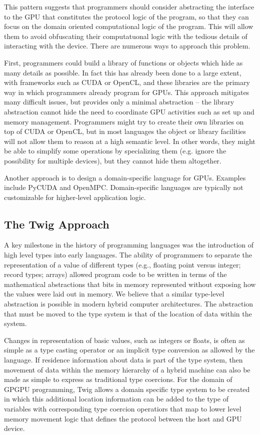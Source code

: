 \documentclass[11pt]{article}
\begin{document}
This pattern suggests that programmers should consider abstracting the
interface to the GPU that constitutes the protocol logic of the
program, so that they can focus on the domain oriented computational
logic of the program.  This will allow them to avoid obfuscating their
computatuonal logic with the tedious details of interacting with the
device. There are numerous ways to approach this problem.

First, programmers could build a library of functions or objects which hide as
many details as possible. In fact this has already been done to a large
extent, with frameworks such as CUDA or OpenCL, and these libraries are the
primary way in which programmers already program for GPUs. This approach
mitigates many difficult issues, but provides only a minimal abstraction --
the library abstraction cannot hide the need to coordinate GPU activities such
as set up and memory management. Programmers might try to create their own
libraries on top of CUDA or OpenCL, but in most languages the object or
library facilities will not allow them to reason at a high semantic level. In
other words, they might be able to simplify some operations by specializing
them (e.g. ignore the possibility for multiple devices), but they cannot hide
them altogether.

Another approach is to design a domain-specific language for GPUs. Examples
include PyCUDA and OpenMPC. Domain-specific languages are typically not
customizable for higher-level application logic.

\subsection{The Twig Approach}


A key milestone in the history of programming languages was the
introduction of high level types into early languages.  The ability of
programmers to separate the representation of a value of different
types (e.g., floating point versus integer; record types; arrays)
allowed program code to be written in terms of the mathematical
abstractions that bits in memory represented without exposing how the
values were laid out in memory.  We believe that a similar type-level
abstraction is possible in modern hybrid computer architectures.  The
abstraction that must be moved to the type system is that of the location
of data within the system.  

Changes in representation of basic values, such as integers or floats, is
often as simple as a type casting operator or an implicit type conversion
as allowed by the language.  If residence information about data is part of
the type system, then movement of data within the memory hierarchy of a hybrid
machine can also be made as simple to express as traditional type coercions.
For the domain of GPGPU programming, Twig allows a domain specific type
system to be created in which this additional location information can be 
added to the type of variables with corresponding type coercion operatiors
that map to lower level memory movement logic that defines the protocol between
the host and GPU device.
\end{document}
